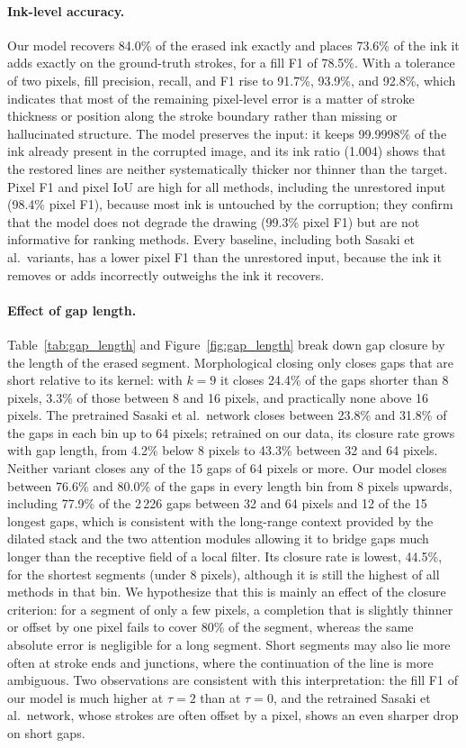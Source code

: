 \documentclass[preprint,12pt]{elsarticle}
\begin{document}
\paragraph{Ink-level accuracy.} Our model recovers 84.0\% of the erased ink exactly
and places 73.6\% of the ink it adds exactly on the ground-truth strokes, for a fill
F1 of 78.5\%. With a tolerance of two pixels, fill precision, recall, and F1 rise to
91.7\%, 93.9\%, and 92.8\%, which indicates that most of the remaining pixel-level
error is a matter of stroke thickness or position along the stroke boundary rather
than missing or hallucinated structure. The model preserves the input:
it keeps 99.9998\% of the ink already present in the corrupted image, and its ink
ratio (1.004) shows that the restored lines are neither systematically thicker nor
thinner than the target. Pixel F1 and pixel IoU are high for all methods, including
the unrestored input (98.4\% pixel F1), because most ink is untouched by the
corruption; they confirm that the model does not degrade the drawing (99.3\% pixel
F1) but are not informative for ranking methods. Every baseline, including both
Sasaki et al.\ variants, has a lower pixel F1 than the unrestored input, because the ink it removes or adds incorrectly outweighs the ink it recovers.

\paragraph{Effect of gap length.} Table~\ref{tab:gap_length} and
Figure~\ref{fig:gap_length} break down gap closure by the length of the erased
segment. Morphological closing only closes gaps that are short relative to its
kernel: with $k = 9$ it closes 24.4\% of the gaps shorter than 8 pixels, 3.3\% of
those between 8 and 16 pixels, and practically none above 16 pixels. The pretrained
Sasaki et al.\ network closes between 23.8\% and 31.8\% of the gaps in each bin up to
64 pixels; retrained on our data, its closure rate grows with gap length, from 4.2\%
below 8 pixels to 43.3\% between 32 and 64 pixels. Neither variant closes any of the
15 gaps of 64 pixels or more. Our model closes between 76.6\% and 80.0\% of the gaps
in every length bin from 8 pixels upwards, including 77.9\% of the 2\,226 gaps between
32 and 64 pixels and 12 of the 15 longest gaps, which is consistent with the long-range context provided by the dilated stack and the two attention modules allowing it to bridge gaps much longer than the receptive field of a local filter. Its closure rate
is lowest, 44.5\%, for the shortest segments (under 8 pixels), although it is still
the highest of all methods in that bin. We hypothesize that this is mainly an effect
of the closure criterion: for a segment of only a few pixels, a completion that is
slightly thinner or offset by one pixel fails to cover 80\% of the segment, whereas
the same absolute error is negligible for a long segment. Short segments may also lie
more often at stroke ends and junctions, where the continuation of the line is more
ambiguous. Two observations are consistent with this interpretation: the fill F1 of
our model is much higher at $\tau=2$ than at $\tau=0$, and the retrained Sasaki et
al.\ network, whose strokes are often offset by a pixel, shows an even sharper drop
on short gaps.
\end{document}
